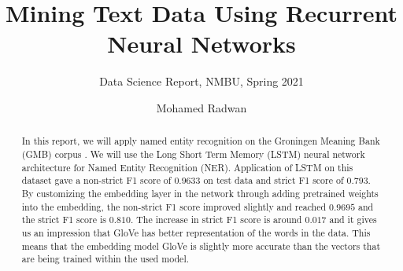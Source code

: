 \documentclass[sigconf, nonacm, natbib, screen, balance=False]{acmart}
\begin{document}
\title{Mining Text Data Using Recurrent Neural Networks}
\subtitle{Data Science Report, NMBU, Spring 2021}

\author{Mohamed Radwan}
\affiliation{}  %


\begin{abstract}
In this report, we will apply named entity recognition on the Groningen Meaning Bank (GMB) corpus \citep{Bos2017GMB}. We will use the Long Short Term Memory (LSTM) neural network architecture for Named Entity Recognition (NER). Application of LSTM on this dataset gave a non-strict F1 score of $0.9633$ on test data and strict F1 score of $0.793$. By customizing the embedding layer in the network through adding pretrained weights into the embedding, the non-strict F1 score improved slightly and reached $0.9695$ and the strict F1 score is $0.810$. The increase in strict F1 score is around $0.017$ and it gives us an impression that GloVe has better representation of the words in the data. This means that the embedding model GloVe is slightly more accurate than the vectors that are being trained within the used model. 

\end{abstract}
\maketitle
\end{document}
